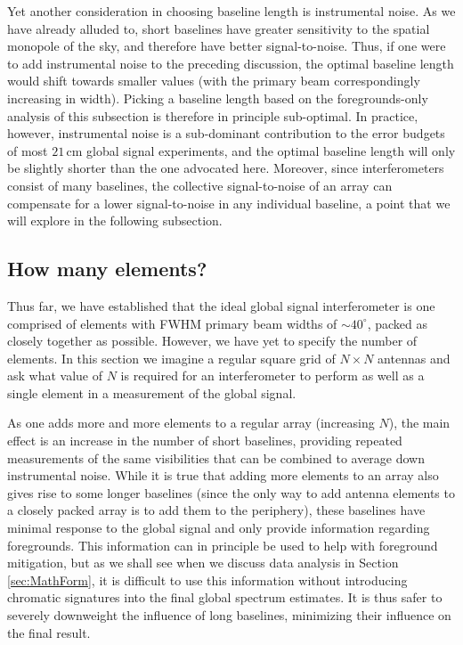 \documentclass[twocolumn,apj,numberedappendix]{emulateapj}
\begin{document}
Yet another consideration in choosing baseline length is instrumental noise. As we have already alluded to, short baselines have greater sensitivity to the spatial monopole of the sky, and therefore have better signal-to-noise. Thus, if one were to add instrumental noise to the preceding discussion, the optimal baseline length would shift towards smaller values (with the primary beam correspondingly increasing in width). Picking a baseline length based on the foregrounds-only analysis of this subsection is therefore in principle sub-optimal. In practice, however, instrumental noise is a sub-dominant contribution to the error budgets of most $21\,\textrm{cm}$ global signal experiments, and the optimal baseline length will only be slightly shorter than the one advocated here. Moreover, since interferometers consist of many baselines, the collective signal-to-noise of an array can compensate for a lower signal-to-noise in any individual baseline, a point that we will explore in the following subsection.

\subsection{How many elements?}
\label{sec:numElems}
Thus far, we have established that the ideal global signal interferometer is one comprised of elements with FWHM primary beam widths of $\sim40^\circ$, packed as closely together as possible. However, we have yet to specify the number of elements. In this section we imagine a regular square grid of $N \times N$ antennas and ask what value of $N$ is required for an interferometer to perform as well as a single element in a measurement of the global signal.

As one adds more and more elements to a regular array (increasing $N$), the main effect is an increase in the number of short baselines, providing repeated measurements of the same visibilities that can be combined to average down instrumental noise. While it is true that adding more elements to an array also gives rise to some longer baselines (since the only way to add antenna elements to a closely packed array is to add them to the periphery), these baselines have minimal response to the global signal and only provide information regarding foregrounds. This information can in principle be used to help with foreground mitigation, but as we shall see when we discuss data analysis in Section \ref{sec:MathForm}, it is difficult to use this information without introducing chromatic signatures into the final global spectrum estimates. It is thus safer to severely downweight the influence of long baselines, minimizing their influence on the final result.
\end{document}
